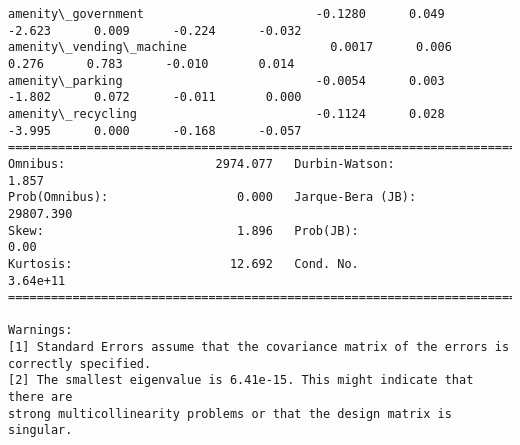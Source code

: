 \documentclass[11pt]{article}
\begin{document}
\begin{Verbatim}[commandchars=\\\{\}]
amenity\_government                        -0.1280      0.049     -2.623      0.009      -0.224      -0.032
amenity\_vending\_machine                    0.0017      0.006      0.276      0.783      -0.010       0.014
amenity\_parking                           -0.0054      0.003     -1.802      0.072      -0.011       0.000
amenity\_recycling                         -0.1124      0.028     -3.995      0.000      -0.168      -0.057
==============================================================================
Omnibus:                     2974.077   Durbin-Watson:                   1.857
Prob(Omnibus):                  0.000   Jarque-Bera (JB):            29807.390
Skew:                           1.896   Prob(JB):                         0.00
Kurtosis:                      12.692   Cond. No.                     3.64e+11
==============================================================================

Warnings:
[1] Standard Errors assume that the covariance matrix of the errors is correctly specified.
[2] The smallest eigenvalue is 6.41e-15. This might indicate that there are
strong multicollinearity problems or that the design matrix is singular.

    \end{Verbatim}
\end{document}
